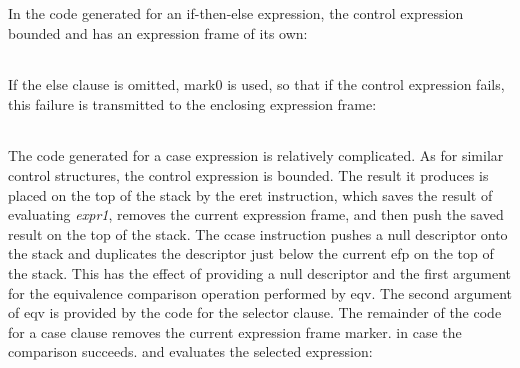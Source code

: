 In the code generated for an if-then-else expression, the control
expression bounded and has an expression frame of its own:

\begin{center}
\tablelasttail{\hline}
\begin{xtabular}{|m{1.9073598in}|m{2.75596in}|}

\end{xtabular}
\end{center}

If the else clause is omitted, mark0 is used, so that if the control
expression fails, this failure is transmitted to the enclosing
expression frame:

\begin{center}
\tablelasttail{\hline}
\begin{xtabular}{|m{1.9073598in}|m{2.75596in}|}

\end{xtabular}
\end{center}

The code generated for a case expression is relatively complicated. As
for similar control structures, the control expression is bounded. The
result it produces is placed on the top of the stack by the eret
instruction, which saves the result of evaluating \textit{expr1},
removes the current expression frame, and then push the saved result
on the top of the stack. The ccase instruction pushes a null
descriptor onto the stack and duplicates the descriptor just below the
current efp on the top of the stack. This has the effect of providing
a null descriptor and the first argument for the equivalence
comparison operation performed by eqv. The second argument of eqv is
provided by the code for the selector clause. The remainder of the
code for a case clause removes the current expression frame marker. in
case the comparison succeeds. and evaluates the selected expression:

